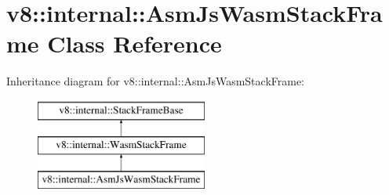 \hypertarget{classv8_1_1internal_1_1AsmJsWasmStackFrame}{}\section{v8\+:\+:internal\+:\+:Asm\+Js\+Wasm\+Stack\+Frame Class Reference}
\label{classv8_1_1internal_1_1AsmJsWasmStackFrame}
Inheritance diagram for v8\+:\+:internal\+:\+:Asm\+Js\+Wasm\+Stack\+Frame\+:\begin{figure}[H]
\begin{center}
\leavevmode
\includegraphics[height=3.000000cm]{classv8_1_1internal_1_1AsmJsWasmStackFrame}
\end{center}
\end{figure}
